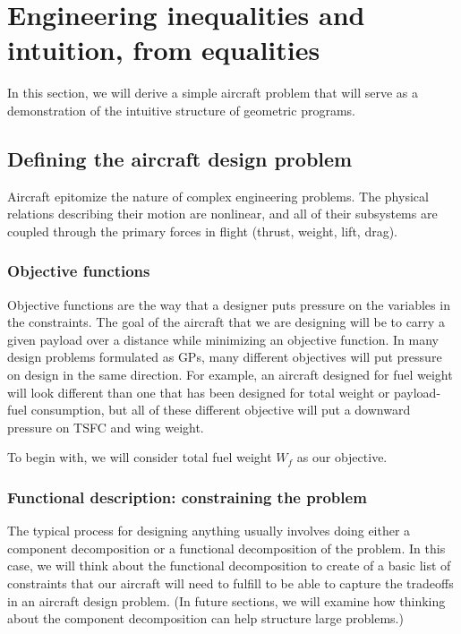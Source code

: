 \chapter{Engineering inequalities and intuition, from equalities}

In this section, we will derive a simple aircraft problem that will serve as 
a demonstration of the intuitive structure of geometric programs. 

\section{Defining the aircraft design problem}

Aircraft epitomize the nature of complex engineering problems. The physical 
relations describing their motion are nonlinear, and all of their subsystems are 
coupled through the primary forces in flight (thrust, weight, lift, drag). 

\subsection{Objective functions}

Objective functions are the way that a designer puts pressure on the variables 
in the constraints. The goal of the aircraft that we are designing will be to carry a given payload
over a distance while minimizing an objective function. In many design problems
formulated as \gls{GP}s, many different objectives will put pressure on design 
in the same direction. For example, an aircraft designed for fuel weight will look different than one
that has been designed for total weight or payload-fuel consumption, but all of
these different objective will put a downward pressure on TSFC and wing weight. 

To begin with, we will consider total fuel weight $W_f$ as our objective.

\subsection{Functional description: constraining the problem}

The typical process for designing anything usually involves doing either a
component decomposition or a functional decomposition of the problem. In
this case, we will think about the functional decomposition to create of a
basic list of constraints that our aircraft will need to fulfill to be
able to capture the tradeoffs in an aircraft design problem. (In future
sections, we will examine how thinking about the component decomposition
can help structure large problems.)

